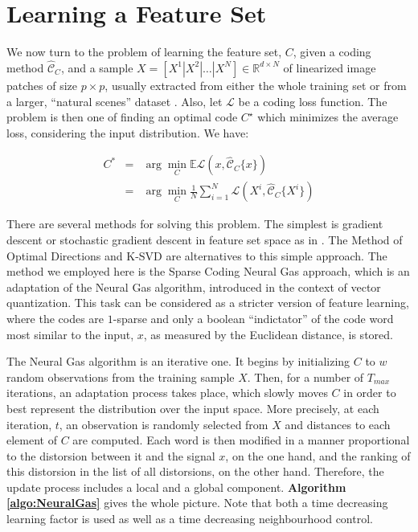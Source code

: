 \documentclass[runningheads,a4paper]{llncs}
\newcommand{\hctimes}[2]{{#1}\!\times\!{#2}}
\begin{document}
\section{Learning a Feature Set}

We now turn to the problem of learning the feature set, $C$, given a coding method $\hat{\mathcal{C}}_C$, and a sample $X = \left[ X^1 \left|\right. X^2 \left|\right. \dots \left|\right. X^N \right] \in \mathbb{R}^{\hctimes{d}{N}}$ of linearized image patches of size $\hctimes{p}{p}$, usually extracted from either the whole training set or from a larger, ``natural scenes'' dataset \cite{self-taught-learning}. Also, let $\mathcal{L}$ be a coding loss function. The problem is then one of finding an optimal code $C^{\star}$ which minimizes the average loss, considering the input distribution. We have:

\begin{eqnarray}
\nonumber
C^* & = & \arg\min_{C} \mathbb{E}\mathcal{L}(x,\mathcal{\hat{C}}_C\{x\}) \\
\label{eq:MinEquation}
    & = & \arg\min_{C} \frac{1}{N} \sum_{i=1}^N \mathcal{L}(X^i,\mathcal{\hat{C}}_C\{X^i\})
\end{eqnarray}

There are several methods for solving this problem. The simplest is gradient descent or stochastic gradient descent in feature set space as in \cite{emergence-sparse-coding,sparse-coding-strategy-V1}. The Method of Optimal Directions \cite{mod-frame-design} and K-SVD \cite{ksvd-sparse-representation} are alternatives to this simple approach. The method we employed here is the Sparse Coding Neural Gas approach, which is an adaptation of the Neural Gas algorithm, introduced in the context of vector quantization. This task can be considered as a stricter version of feature learning, where the codes are $1$-sparse and only a boolean ``indictator'' of the code word most similar to the input, $x$, as measured by the Euclidean distance, is stored.

The Neural Gas algorithm is an iterative one. It begins by initializing $C$ to $w$ random observations from the training sample $X$. Then, for a number of $T_{max}$ iterations, an adaptation process takes place, which slowly moves $C$ in order to best represent the distribution over the input space. More precisely, at each iteration, $t$, an observation is randomly selected from $X$ and distances to each element of $C$ are computed. Each word is then modified in a manner proportional to the distorsion between it and the signal $x$, on the one hand, and the ranking of this distorsion in the list of all distorsions, on the other hand. Therefore, the update process includes a local and a global component. \textbf{Algorithm \ref{algo:NeuralGas}} gives the whole picture. Note that both a time decreasing learning factor is used as well as a time decreasing neighbourhood control. 
\end{document}
